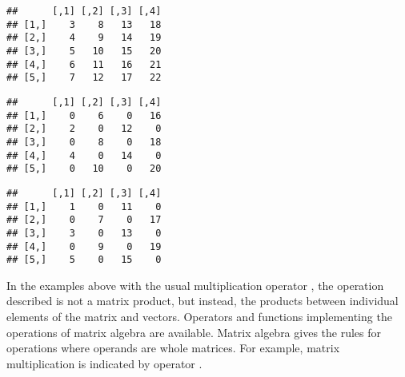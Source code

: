 \documentclass[krantz2]{krantz}\usepackage{knitr}
\begin{document}
\begin{knitrout}\footnotesize
{}\color{fgcolor}\begin{kframe}
\begin{alltt}
 \hlopt{+} 
\end{alltt}
\begin{verbatim}
##      [,1] [,2] [,3] [,4]
## [1,]    3    8   13   18
## [2,]    4    9   14   19
## [3,]    5   10   15   20
## [4,]    6   11   16   21
## [5,]    7   12   17   22
\end{verbatim}
\begin{alltt}
 \hlopt{*} \hlopt{:}
\end{alltt}
\begin{verbatim}
##      [,1] [,2] [,3] [,4]
## [1,]    0    6    0   16
## [2,]    2    0   12    0
## [3,]    0    8    0   18
## [4,]    4    0   14    0
## [5,]    0   10    0   20
\end{verbatim}
\begin{alltt}
 \hlopt{*} \hlopt{:}
\end{alltt}
\begin{verbatim}
##      [,1] [,2] [,3] [,4]
## [1,]    1    0   11    0
## [2,]    0    7    0   17
## [3,]    3    0   13    0
## [4,]    0    9    0   19
## [5,]    5    0   15    0
\end{verbatim}
\end{kframe}
\end{knitrout}

In the examples above with the usual multiplication operator \code{*}, the operation described is not a matrix product, but instead, the products between individual elements of the matrix and vectors. Operators and functions implementing the operations of matrix algebra are available. Matrix algebra gives the rules for operations where operands are whole matrices. For example, matrix multiplication is indicated by operator \Roperator{\%*\%}. 

\begin{knitrout}\footnotesize
{}\color{fgcolor}
\end{knitrout}
\end{document}
